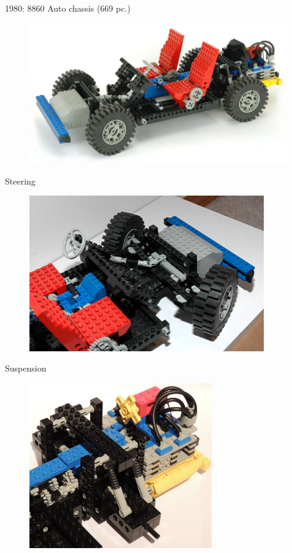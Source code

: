 \documentclass[xcolor=dvipsnames]{beamer}
\begin{document}
\begin{frame}[fragile]{1980: 8860 Auto chassis (669 pc.)}
\begin{figure}[H]
 \centering
 \includegraphics[width=0.99\textwidth]{1980_8860_car.jpg}
\end{figure}
\end{frame}

\begin{frame}[fragile]{Steering}
\begin{figure}[H]
 \centering
 \includegraphics[trim={3cm 2cm 0 0},clip,width=0.9\textwidth]{1980_8860_steering.jpg}
\end{figure}
\end{frame}

\begin{frame}[fragile]{Suspension}
\begin{figure}[H]
 \centering
 \includegraphics[width=0.7\textwidth]{1980_8860_suspension.jpg}
\end{figure}
\end{frame}
\end{document}
